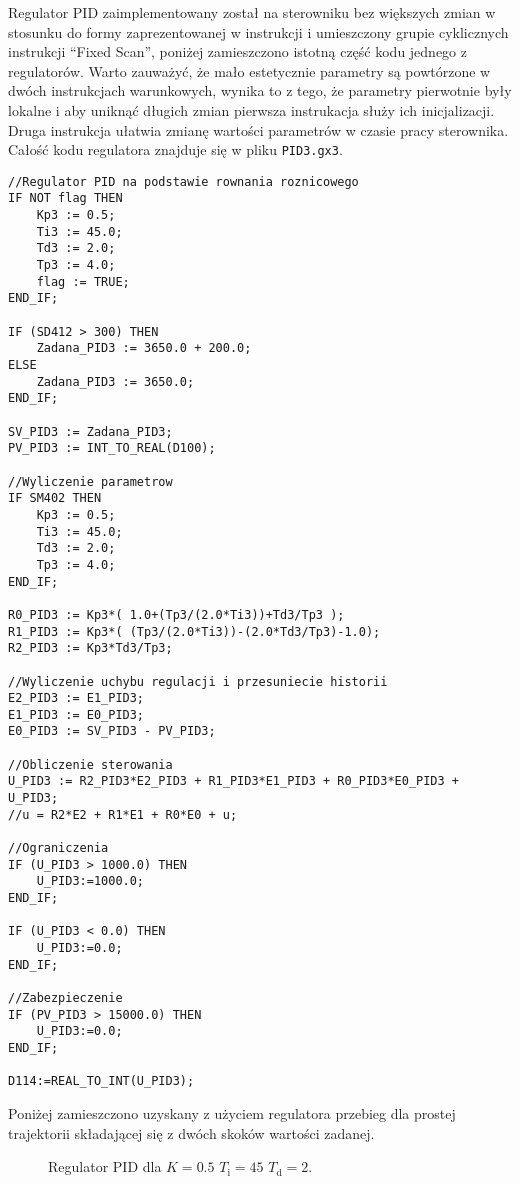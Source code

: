 Regulator PID zaimplementowany został na sterowniku bez większych zmian w stosunku do formy zaprezentowanej w instrukcji i umieszczony grupie cyklicznych instrukcji ``Fixed Scan'', poniżej zamieszczono istotną część kodu jednego z regulatorów. Warto zauważyć, że mało estetycznie parametry są powtórzone w dwóch instrukcjach warunkowych, wynika to z tego, że parametry pierwotnie były lokalne i aby uniknąć długich zmian pierwsza instrukacja służy ich inicjalizacji. Druga instrukcja ułatwia zmianę wartości parametrów w czasie pracy sterownika. Całość kodu regulatora znajduje się w pliku \verb+PID3.gx3+.

\begin{lstlisting}
//Regulator PID na podstawie rownania roznicowego
IF NOT flag THEN
    Kp3 := 0.5;
    Ti3 := 45.0;
    Td3 := 2.0;
    Tp3 := 4.0;
    flag := TRUE;
END_IF;

IF (SD412 > 300) THEN
    Zadana_PID3 := 3650.0 + 200.0;
ELSE
    Zadana_PID3 := 3650.0;
END_IF;

SV_PID3 := Zadana_PID3;
PV_PID3 := INT_TO_REAL(D100);

//Wyliczenie parametrow
IF SM402 THEN
    Kp3 := 0.5;
    Ti3 := 45.0;
    Td3 := 2.0;
    Tp3 := 4.0;
END_IF;

R0_PID3 := Kp3*( 1.0+(Tp3/(2.0*Ti3))+Td3/Tp3 );
R1_PID3 := Kp3*( (Tp3/(2.0*Ti3))-(2.0*Td3/Tp3)-1.0);
R2_PID3 := Kp3*Td3/Tp3;

//Wyliczenie uchybu regulacji i przesuniecie historii
E2_PID3 := E1_PID3;
E1_PID3 := E0_PID3;
E0_PID3 := SV_PID3 - PV_PID3;

//Obliczenie sterowania
U_PID3 := R2_PID3*E2_PID3 + R1_PID3*E1_PID3 + R0_PID3*E0_PID3 + U_PID3;
//u = R2*E2 + R1*E1 + R0*E0 + u;

//Ograniczenia
IF (U_PID3 > 1000.0) THEN
    U_PID3:=1000.0;
END_IF;

IF (U_PID3 < 0.0) THEN
    U_PID3:=0.0;
END_IF;

//Zabezpieczenie
IF (PV_PID3 > 15000.0) THEN
    U_PID3:=0.0;
END_IF;

D114:=REAL_TO_INT(U_PID3);
\end{lstlisting}

Poniżej zamieszczono uzyskany z użyciem regulatora przebieg dla prostej trajektorii składającej się z dwóch skoków wartości zadanej.

\begin{figure}[ht]
\centering

\caption{Regulator PID dla $K=\num{0.5}$ $T_{\mathrm{i}}=\num{45}$ $T_{\mathrm{d}}=\num{2}$.}
\label{Z3PID}
\end{figure}


